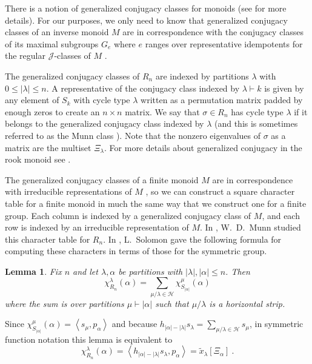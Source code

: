 \documentclass{amsart}
\newtheorem{lemma}{Lemma}[section]
\theoremstyle{definition}
\newcommand{\xt}{\tilde x}
\begin{document}
There is a notion of generalized conjugacy classes for monoids (see \cite[Section 7.1]{steinberg} for more details).
For our purposes, we only need to know that generalized conjugacy classes of an inverse monoid
$M$ are in correspondence with the conjugacy classes of its maximal subgroups $G_e$ where $e$
ranges over representative idempotents for the regular $\mathcal{J}$-classes of $M$ \cite[Proposition 7.4]{steinberg}.

The generalized conjugacy classes of $R_n$ are indexed by partitions $\lambda$ with $0\leq|\lambda|\leq n$.
A representative of the conjugacy class indexed by $\lambda\vdash k$ is given by any element of $S_k$ with
cycle type $\lambda$ written as a permutation matrix padded by enough zeros to create an $n\times n$ matrix.
We say that $\sigma\in R_n$ has cycle type $\lambda$
if it belongs to the generalized conjugacy class indexed by $\lambda$
(and this is sometimes referred to as the Munn class \cite{M1957}).
Note that the nonzero eigenvalues of $\sigma$ as a matrix are the multiset $\Xi_\lambda$.
For more details about generalized conjugacy in the rook monoid see \cite[Section 3.2]{steinberg}.

The generalized conjugacy classes of a finite monoid $M$ are
in correspondence with irreducible representations of $M$ \cite[Theorem 7.10]{steinberg},
so we can construct a square character table for a finite monoid
in much the same way that we construct one for a finite group. Each column is indexed by a generalized
conjugacy class of $M$, and each row is indexed by an irreducible representation of $M$.
In \cite{M1957}, W.~D.~Munn studied this character table for $R_n$.
In \cite{solomon2002rep}, L.~Solomon gave the following formula
for computing these characters in terms of those for the symmetric group.

\begin{lemma}\cite[Proposition 3.11]{solomon2002rep}\label{lem:Rn_char_computation}
	Fix $n$ and let $\lambda,\alpha$ be partitions with $|\lambda|,|\alpha|\leq n$. Then
	\[\chi^{\lambda}_{R_n}(\alpha)=\sum_{\mu/\lambda\in\mathcal{H}}\chi_{S_{|\alpha|}}^\mu(\alpha)\]
	where the sum is over partitions $\mu\vdash |\alpha|$ such that $\mu/\lambda$ is a horizontal strip.
\end{lemma}

Since $\chi_{S_{|\alpha|}}^\mu(\alpha) = \left< s_\mu, p_\alpha \right>$
and because $h_{|\alpha|-|\lambda|} s_\lambda = \sum_{\mu/\lambda\in\mathcal{H}} s_\mu$,
in symmetric function notation this lemma is equivalent to
\begin{equation}\label{eq:evaluating_xt}
\chi^{\lambda}_{R_n}(\alpha)
= \left< h_{|\alpha|-|\lambda|} s_\lambda, p_\alpha \right>
= \xt_\lambda[\Xi_\alpha]~.
\end{equation}
\end{document}
